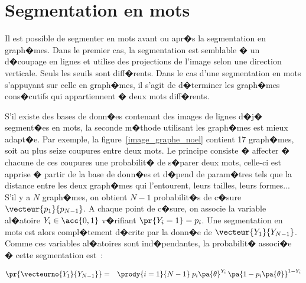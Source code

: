 














\section{Segmentation en mots}


Il est possible de segmenter en mots avant ou apr�s la segmentation en graph�mes. Dans le premier cas, la segmentation est semblable � un d�coupage en lignes et utilise des projections de l'image selon une direction verticale. Seuls les seuils sont diff�rents. Dans le cas d'une segmentation en mots s'appuyant sur celle en graph�mes, il s'agit de d�terminer les graph�mes cons�cutifs qui appartiennent � deux mots diff�rents.


S'il existe des bases de donn�es contenant des images de lignes d�j� segment�es en mots, la seconde m�thode utilisant les graph�mes est mieux adapt�e. Par exemple, la figure~\ref{image_graphe_noel} contient 17 graph�mes, soit au plus seize coupures entre deux mots. Le principe consiste � affecter � chacune de ces coupures une probabilit� de s�parer deux mots, celle-ci est apprise � partir de la base de donn�es et d�pend de param�tres tels que la distance entre les deux graph�mes qui l'entourent, leurs tailles, leurs formes... S'il y a $N$ graph�mes, on obtient $N-1$ probabilit�s de c�sure $\vecteur{p_1}{p_{N-1}}$. A chaque point de c�sure, on associe la variable al�atoire $Y_i \in \acc{0,1}$ v�rifiant $\pr{Y_i = 1} = p_i$. Une segmentation en mots est alors compl�tement d�crite par la donn�e de $\vecteur{Y_1}{Y_{N-1}}$. Comme ces variables al�atoires sont ind�pendantes, la probabilit� associ�e � cette segmentation est~:

            \begin{eqnarray}
            \pr{\vecteurno{Y_1}{Y_{N-1}}} &=& \prody{i=1}{N-1} \; p_i\pa{\theta}^{Y_i} \, \pa{1-p_i\pa{\theta}}^{1-Y_i}
            \label{image_vraisemblance_seg_mot}
            \end{eqnarray}

